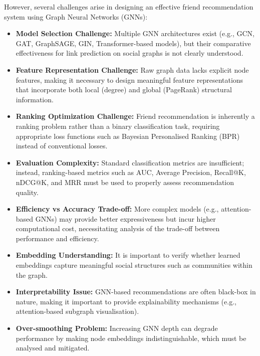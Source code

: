 \documentclass[12pt,a4paper]{article}
\begin{document}
However, several challenges arise in designing an effective friend recommendation system using Graph Neural Networks (GNNs):

\begin{itemize}
    \item \textbf{Model Selection Challenge:} Multiple GNN architectures exist (e.g., GCN, GAT, GraphSAGE, GIN, Transformer-based models), but their comparative effectiveness for link prediction on social graphs is not clearly understood.

    \item \textbf{Feature Representation Challenge:} Raw graph data lacks explicit node features, making it necessary to design meaningful feature representations that incorporate both local (degree) and global (PageRank) structural information.

    \item \textbf{Ranking Optimization Challenge:} Friend recommendation is inherently a ranking problem rather than a binary classification task, requiring appropriate loss functions such as Bayesian Personalised Ranking (BPR) instead of conventional losses.

    \item \textbf{Evaluation Complexity:} Standard classification metrics are insufficient; instead, ranking-based metrics such as AUC, Average Precision, Recall@K, nDCG@K, and MRR must be used to properly assess recommendation quality.

    \item \textbf{Efficiency vs Accuracy Trade-off:} More complex models (e.g., attention-based GNNs) may provide better expressiveness but incur higher computational cost, necessitating analysis of the trade-off between performance and efficiency.

     \item \textbf{Embedding Understanding:} It is important to verify whether learned embeddings capture meaningful social structures such as communities within the graph.

    \item \textbf{Interpretability Issue:} GNN-based recommendations are often black-box in nature, making it important to provide explainability mechanisms (e.g., attention-based subgraph visualisation).


    \item \textbf{Over-smoothing Problem:} Increasing GNN depth can degrade performance by making node embeddings indistinguishable, which must be analysed and mitigated.
\end{itemize}
\end{document}
